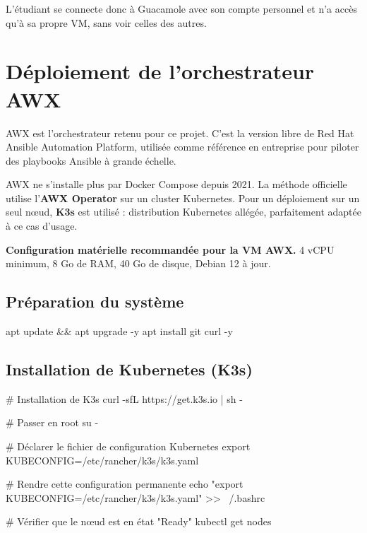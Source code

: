\documentclass[a4paper]{article}
\begin{document}
L'étudiant se connecte donc à Guacamole avec son compte personnel et n'a accès qu'à sa propre VM, sans voir celles des autres.


\section{Déploiement de l'orchestrateur AWX}

AWX est l'orchestrateur retenu pour ce projet. C'est la version libre de Red Hat Ansible Automation Platform, utilisée comme référence en entreprise pour piloter des playbooks Ansible à grande échelle.

AWX ne s'installe plus par Docker Compose depuis 2021. La méthode officielle utilise l'\textbf{AWX Operator} sur un cluster Kubernetes. Pour un déploiement sur un seul nœud, \textbf{K3s} est utilisé : distribution Kubernetes allégée, parfaitement adaptée à ce cas d'usage.

\begin{infobox}
  \textbf{Configuration matérielle recommandée pour la VM AWX.} 4 vCPU minimum, 8 Go de RAM, 40 Go de disque, Debian 12 à jour.
\end{infobox}

\subsection{Préparation du système}

\begin{bashcode}
apt update && apt upgrade -y
apt install git curl -y
\end{bashcode}

\subsection{Installation de Kubernetes (K3s)}

\begin{bashcode}
# Installation de K3s
curl -sfL https://get.k3s.io | sh -

# Passer en root
su -

# Déclarer le fichier de configuration Kubernetes
export KUBECONFIG=/etc/rancher/k3s/k3s.yaml

# Rendre cette configuration permanente
echo "export KUBECONFIG=/etc/rancher/k3s/k3s.yaml" >> ~/.bashrc

# Vérifier que le nœud est en état "Ready"
kubectl get nodes
\end{bashcode}
\end{document}
